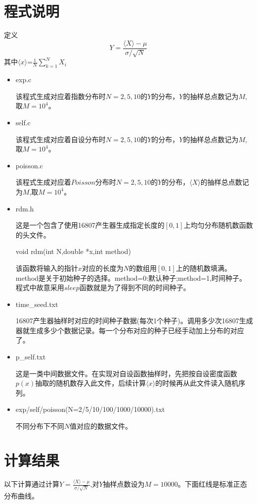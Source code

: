 \documentclass[UTF8]{ctexart}
\begin{document}
	\section{程式说明}
	\begin{flushleft}
		定义$$Y=\frac{\langle X \rangle-\mu}{\sigma/\sqrt{N}}$$
	其中$\langle x \rangle $=$\frac{1}{N}$$\sum_{k=1}^{N}X_i$
	\end{flushleft}
	\begin{itemize}
		\item exp.c
		
		该程式生成对应着指数分布时$N=2,5,10$的$Y$的分布，$Y$的抽样总点数记为$M$,取$M=10^4$。
		
		\item self.c
		
		该程式生成对应着自设分布时$N=2,5,10$的$Y$的分布，$Y$的抽样总点数记为$M$,取$M=10^4$。
		
		\item poisson.c
		
		该程式生成对应着$Poisson$分布时$N=2,5,10$的$Y$的分布，$\langle X \rangle$的抽样总点数记为$M$,取$M=10^4$。
		
		\item rdm.h
			
		这是一个包含了使用16807产生器生成指定长度的$[0,1]$上均匀分布随机数函数的头文件。
		
		\subitem void rdm(int N,double *x,int method)
		
		该函数将输入的指针$x$对应的长度为$N$的数组用$[0,1]$上的随机数填满。method是关于初始种子的选择。method=0:默认种子;method=1,时间种子。程式中故意采用$sleep$函数就是为了得到不同的时间种子。
		
		\item time\_seed.txt
		
		16807产生器抽样时对应的时间种子数据(每次1个种子)。调用多少次16807生成器就生成多少个数据记录。每一个分布对应的种子已经手动加上分布的对应了。
		
		\item p\_self.txt
		
		这是一类中间数据文件。在实现对自设函数抽样时，先把按自设密度函数$p(x)$抽取的随机数存入此文件，后续计算$\langle x \rangle$的时候再从此文件读入随机序列。
		
		\item exp/self/poisson(N=2/5/10/100/1000/10000).txt
		
		不同分布下不同$N$值对应的数据文件。
	\end{itemize}
	
	\section{计算结果}
	以下计算通过计算$Y=\frac{\langle X \rangle-\mu}{\sigma/\sqrt{N}}$,对$Y$抽样点数设为$M=10000$。下面红线是标准正态分布曲线。
	
\end{document}
